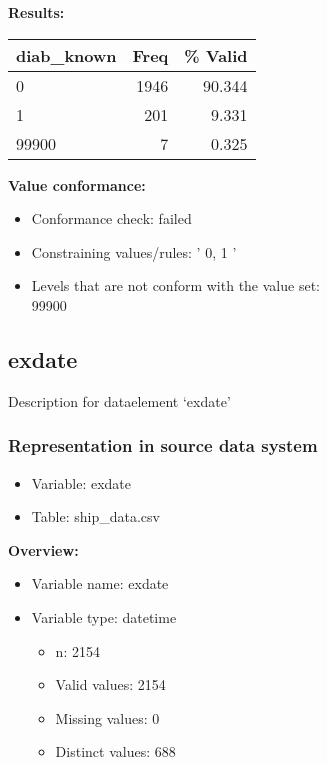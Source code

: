 \documentclass[
]{article}
\providecommand{\tightlist}{%
  \setlength{\itemsep}{0pt}\setlength{\parskip}{0pt}}
\begin{document}
\textbf{Results:}\\

\begin{table}[H]
\centering
\begin{tabular}{l|r|r}
\hline
\textbf{diab\_known} & \textbf{Freq} & \textbf{\% Valid}\\
\hline
0 & 1946 & 90.344\\
\hline
1 & 201 & 9.331\\
\hline
99900 & 7 & 0.325\\
\hline
\end{tabular}
\end{table}

\textbf{Value conformance:}

\begin{itemize}
\tightlist
\item
  Conformance check: failed
\item
  Constraining values/rules: ' 0, 1 '
\item
  Levels that are not conform with the value set:\\
  99900
\end{itemize}

\newpage

\hypertarget{exdate}{%
\subsection{exdate}\label{exdate}}

Description for dataelement `exdate'

\hypertarget{representation-in-source-data-system-10}{%
\subsubsection{\texorpdfstring{Representation in \textbf{source} data
system}{Representation in source data system}}\label{representation-in-source-data-system-10}}

\begin{itemize}
\tightlist
\item
  Variable: exdate
\item
  Table: ship\_data.csv
\end{itemize}

\textbf{Overview:}

\begin{itemize}
\tightlist
\item
  Variable name: exdate
\item
  Variable type: datetime

  \begin{itemize}
  \tightlist
  \item
    n: 2154
  \item
    Valid values: 2154
  \item
    Missing values: 0
  \item
    Distinct values: 688
  \end{itemize}
\end{itemize}
\end{document}
